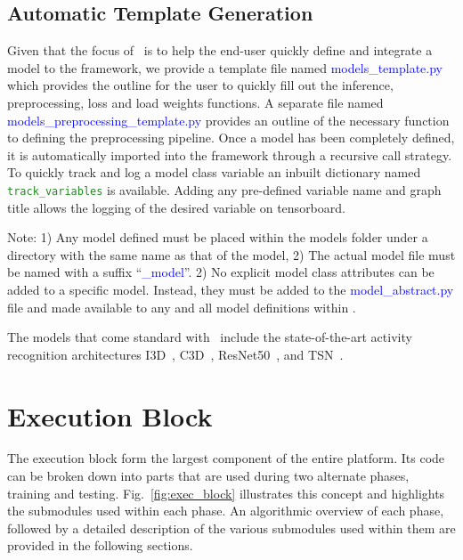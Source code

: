 \documentclass{llncs}
\begin{document}
\subsection{Automatic Template Generation}
Given that the focus of \acro~is to help the end-user quickly define and integrate a model to the framework, we provide a template file named \textcolor{blue}{models\_template.py} which provides the outline for the user to quickly fill out the inference, preprocessing, loss and load weights functions.
A separate file named \textcolor{blue}{models\_preprocessing\_template.py} provides an outline of the necessary function to defining the preprocessing pipeline.
Once a model has been completely defined, it is automatically imported into the framework through a recursive call strategy.
To quickly track and log a model class variable an inbuilt dictionary named \texttt{\textcolor{ForestGreen}{track\_variables}} is available.
Adding any pre-defined variable name and graph title allows the logging of the desired variable on tensorboard.

Note: 1) Any model defined must be placed within the models folder under a directory with the same name as that of the model,
2) The actual model file must be named with a suffix ``\textcolor{blue}{\_model}''.
2) No explicit model class attributes can be added to a specific model. Instead, they must be added to the \textcolor{blue}{model\_abstract.py} file and made available to any and all model definitions within \acro.

The models that come standard with \acro~include the state-of-the-art activity recognition architectures I3D~\cite{}, C3D~\cite{}, ResNet50~\cite{}, and TSN~\cite{}.




\section{Execution Block}
\label{sec:execblock}
The execution block form the largest component of the entire platform. Its code can be broken down into parts that are used during two alternate phases, training and testing.
Fig.~\ref{fig:exec_block} illustrates this concept and highlights the submodules used within each phase.
An algorithmic overview of each phase, followed by a detailed description of the various submodules used within them are provided in the following sections.
\end{document}

